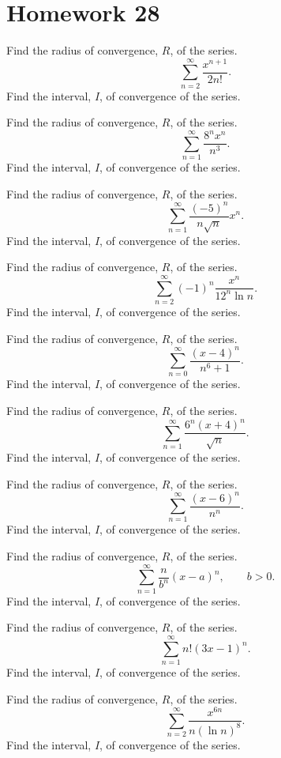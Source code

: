 \section*{Homework 28}
\begin{problem}[WebAssign HW 28, \# 1]
Find the radius of convergence, $R$, of the series.
\[
\sum_{n=2}^\infty\frac{x^{n+1}}{2n!}.
\]
Find the interval, $I$, of convergence of the series.
\end{problem}
\begin{problem}[WebAssign HW 28, \# 2]
Find the radius of convergence, $R$, of the series.
\[
\sum_{n=1}^\infty\frac{8^nx^n}{n^3}.
\]
Find the interval, $I$, of convergence of the series.
\end{problem}
\begin{problem}[WebAssign HW 28, \# 3]
Find the radius of convergence, $R$, of the series.
\[
\sum_{n=1}^\infty\frac{(-5)^n}{n\sqrt{n}}x^n.
\]
Find the interval, $I$, of convergence of the series.
\end{problem}
\begin{problem}[WebAssign HW 28, \# 4]
Find the radius of convergence, $R$, of the series.
\[
\sum_{n=2}^\infty(-1)^n\frac{x^n}{12^n\ln n}.
\]
Find the interval, $I$, of convergence of the series.
\end{problem}
\begin{problem}[WebAssign HW 28, \# 5]
Find the radius of convergence, $R$, of the series.
\[
\sum_{n=0}^\infty\frac{(x-4)^n}{n^6+1}.
\]
Find the interval, $I$, of convergence of the series.
\end{problem}
\begin{problem}[WebAssign HW 28, \# 6]
Find the radius of convergence, $R$, of the series.
\[
\sum_{n=1}^\infty\frac{6^n(x+4)^n}{\sqrt{n}}.
\]
Find the interval, $I$, of convergence of the series.
\end{problem}
\begin{problem}[WebAssign HW 28, \# 7]
Find the radius of convergence, $R$, of the series.
\[
\sum_{n=1}^\infty\frac{(x-6)^n}{n^n}.
\]
Find the interval, $I$, of convergence of the series.
\end{problem}
\begin{problem}[WebAssign HW 28, \# 8]
Find the radius of convergence, $R$, of the series.
\[
\sum_{n=1}^\infty\frac{n}{b^n}(x-a)^n, \qquad b>0.
\]
Find the interval, $I$, of convergence of the series.
\end{problem}
\begin{problem}[WebAssign HW 28, \# 9]
Find the radius of convergence, $R$, of the series.
\[
\sum_{n=1}^\infty n!(3x-1)^n.
\]
Find the interval, $I$, of convergence of the series.
\end{problem}
\begin{problem}[WebAssign HW 28, \# 10]
Find the radius of convergence, $R$, of the series.
\[
\sum_{n=2}^\infty\frac{x^{6n}}{n(\ln n)^8}.
\]
Find the interval, $I$, of convergence of the series.
\end{problem}
\newpage
